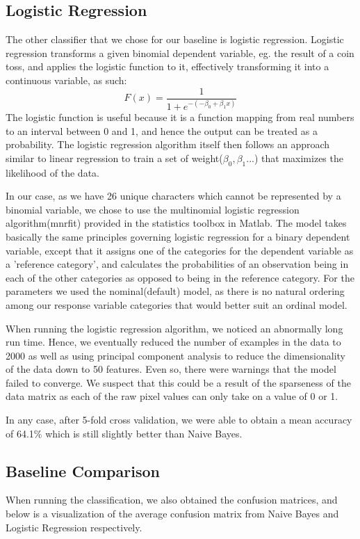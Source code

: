 \documentclass{article} %
\begin{document}
\subsection{Logistic Regression}
The other classifier that we chose for our baseline is logistic regression.
Logistic regression transforms a given binomial dependent variable, eg. the result of a coin toss, and applies the logistic function to it, effectively transforming it into a continuous variable, as such:
$$F(x) = \frac{1}{1+e^{-(-\beta_0 + \beta_1x)}}$$
The logistic function is useful because it is a function mapping from real numbers to an interval between 0 and 1, and hence the output can be treated as a probability. The logistic regression algorithm itself then follows an approach similar to linear regression to train a set of weight($\beta_0, \beta_1...$) that maximizes the likelihood of the data.

In our case, as we have 26 unique characters which cannot be represented by a binomial variable, we chose to use the multinomial logistic regression algorithm(mnrfit) provided in the statistics toolbox in Matlab. The model takes basically the same principles governing logistic regression for a binary dependent variable, except that it assigns one of the categories for the dependent variable as a 'reference category', and calculates the probabilities of an observation being in each of the other categories as opposed to being in the reference category. For the parameters we used the nominal(default) model, as there is no natural ordering among our response variable categories that would better suit an ordinal model.

When running the logistic regression algorithm, we noticed an abnormally long run time. Hence, we eventually reduced the number of examples in the data to 2000 as well as using principal component analysis to reduce the dimensionality of the data down to 50 features. Even so, there were warnings that the model failed to converge. We suspect that this could be a result of the sparseness of the data matrix as each of the raw pixel values can only take on a value of 0 or 1.

In any case, after 5-fold cross validation, we were able to obtain a mean accuracy of 64.1\% which is still slightly better than Naive Bayes.

\subsection{Baseline Comparison}
When running the classification, we also obtained the confusion matrices, and below is a visualization of the average confusion matrix from Naive Bayes and Logistic Regression respectively.
\end{document}
